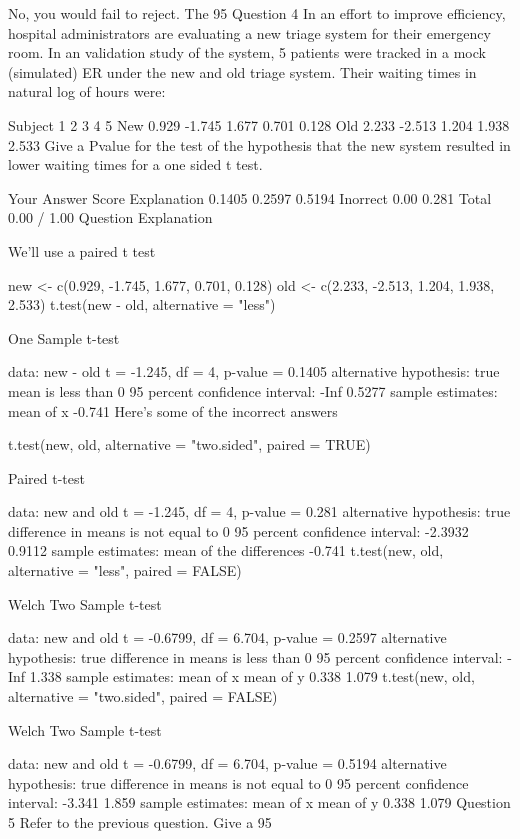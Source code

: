 No, you would fail to reject. The 95%
Question 4
In an effort to improve efficiency, hospital administrators are evaluating a new triage system for their emergency room. In an validation study of the system, 5 patients were tracked in a mock (simulated) ER under the new and old triage system. Their waiting times in natural log of hours were:

Subject	1	2	3	4	5
New	0.929	-1.745	1.677	0.701	0.128
Old	2.233	-2.513	1.204	1.938	2.533
Give a Pvalue for the test of the hypothesis that the new system resulted in lower waiting times for a one sided t test.

Your Answer		Score	Explanation
0.1405			
0.2597			
0.5194	Inorrect	0.00	
0.281			
Total		0.00 / 1.00	
Question Explanation

We'll use a paired t test

new <- c(0.929, -1.745, 1.677, 0.701, 0.128)
old <- c(2.233, -2.513, 1.204, 1.938, 2.533)
t.test(new - old, alternative = "less")

    One Sample t-test

data:  new - old 
t = -1.245, df = 4, p-value = 0.1405
alternative hypothesis: true mean is less than 0 
95 percent confidence interval:
   -Inf 0.5277 
sample estimates:
mean of x 
   -0.741 
Here's some of the incorrect answers

t.test(new, old, alternative = "two.sided", paired = TRUE)

    Paired t-test

data:  new and old 
t = -1.245, df = 4, p-value = 0.281
alternative hypothesis: true difference in means is not equal to 0 
95 percent confidence interval:
 -2.3932  0.9112 
sample estimates:
mean of the differences 
                 -0.741 
t.test(new, old, alternative = "less", paired = FALSE)

    Welch Two Sample t-test

data:  new and old 
t = -0.6799, df = 6.704, p-value = 0.2597
alternative hypothesis: true difference in means is less than 0 
95 percent confidence interval:
  -Inf 1.338 
sample estimates:
mean of x mean of y 
    0.338     1.079 
t.test(new, old, alternative = "two.sided", paired = FALSE)

    Welch Two Sample t-test

data:  new and old 
t = -0.6799, df = 6.704, p-value = 0.5194
alternative hypothesis: true difference in means is not equal to 0 
95 percent confidence interval:
 -3.341  1.859 
sample estimates:
mean of x mean of y 
    0.338     1.079 
Question 5
Refer to the previous question. Give a 95%

